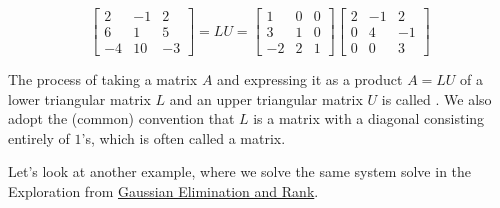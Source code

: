 \documentclass{ximera}
\begin{document}
$$\begin{bmatrix}2&-1&2\\6&1&5\\-4&10&-3\end{bmatrix}=LU=\begin{bmatrix}1&0&0\\3&1&0\\-2&2&1\end{bmatrix}\begin{bmatrix}2&-1&2\\0&4&-1\\0&0&3\end{bmatrix}$$

The process of taking a matrix $A$ and expressing it as a product $A=LU$ of a lower triangular matrix $L$ and an upper triangular matrix $U$ is called .
We also adopt the (common) convention that $L$ is a matrix with a diagonal consisting entirely of $1$'s, which is often called a  matrix.

Let's look at another example, where we solve the same system solve in the Exploration from \href{https://ximera.osu.edu/oerlinalg/LinearAlgebra/SYS-0030/main}{Gaussian Elimination and Rank}.
\end{document}
